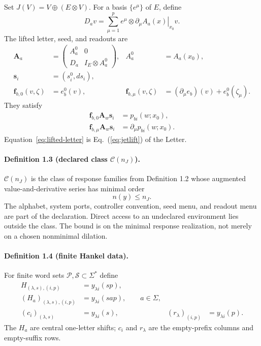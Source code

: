 \documentclass[aps,prl,onecolumn,superscriptaddress,nofootinbib]{revtex4-2}
\newcommand{\cP}{\mathcal P}
\newcommand{\cS}{\mathcal S}
\newcommand{\cC}{\mathcal C}
\begin{document}
Set $J(V)=V\oplus(E\otimes V)$.  For a basis $\{e^\mu\}$ of $E$, define
\begin{equation}
 D_av=\sum_{\mu=1}^p e^\mu\otimes
 \left.\partial_\mu A_a(x)\right|_{x_0}v.
 \label{eq:Da}
\end{equation}
The lifted letter, seed, and readouts are
\begin{align}
 \bm A_a&=
 \begin{pmatrix}
 A_a^0&0\\D_a&I_E\otimes A_a^0
 \end{pmatrix},
 &A_a^0&=A_a(x_0),
 \label{eq:lifted-letter}\\
 \bm s_i&=(s_i^0,ds_i),
 \label{eq:lifted-seed}\\
 \bm f_{b,0}(v,\zeta)&=e_b^0(v),
 &\bm f_{b,\mu}(v,\zeta)&=(\partial_\mu e_b)(v)+e_b^0(\zeta_\mu).
 \label{eq:lifted-readout}
\end{align}
They satisfy
\begin{align}
 \bm f_{b,0}\bm A_w\bm s_i&=p_{bi}(w;x_0),\nonumber\\
 \bm f_{b,\mu}\bm A_w\bm s_i&=\partial_\mu p_{bi}(w;x_0).
 \label{eq:jet-output}
\end{align}
Equation~\eqref{eq:lifted-letter} is Eq.~(\ref{eq:jetlift}) of the Letter.

\paragraph{Definition 1.3 (declared class $\cC(n_J)$).}
$\cC(n_J)$ is the class of response families from Definition 1.2 whose augmented value-and-derivative series has minimal order
\begin{equation}
 n(y)\le n_J.
 \label{eq:class-order}
\end{equation}
The alphabet, system ports, controller convention, seed menu, and readout menu are part of the declaration.  Direct access to an undeclared environment lies outside the class.  The bound is on the minimal response realization, not merely on a chosen nonminimal dilation.

\paragraph{Definition 1.4 (finite Hankel data).}
For finite word sets $\cP,\cS\subset\Sigma^*$ define
\begin{align}
 H_{(\lambda,s),(i,p)}&=y_{\lambda i}(sp),\label{eq:Hdef}\\
 (H_a)_{(\lambda,s),(i,p)}&=y_{\lambda i}(sap),
 \qquad a\in\Sigma,\label{eq:Hadef}\\
 (c_i)_{(\lambda,s)}&=y_{\lambda i}(s),
 & (r_\lambda)_{(i,p)}&=y_{\lambda i}(p).
 \label{eq:boundarydef}
\end{align}
The $H_a$ are central one-letter shifts; $c_i$ and $r_\lambda$ are the empty-prefix columns and empty-suffix rows.
\end{document}
